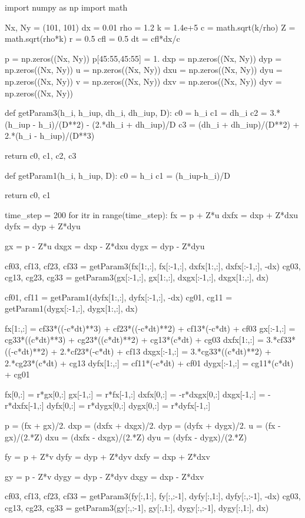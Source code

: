 \documentclass[dvipdfmx, 9pt, a4paper]{jsarticle}
\begin{document}
\begin{python}
import numpy as np
import math

Nx, Ny = (101, 101)
dx = 0.01
rho = 1.2
k = 1.4e+5
c = math.sqrt(k/rho)
Z = math.sqrt(rho*k)
r = 0.5
cfl = 0.5
dt = cfl*dx/c

p = np.zeros((Nx, Ny))
p[45:55,45:55] = 1.
dxp = np.zeros((Nx, Ny))
dyp = np.zeros((Nx, Ny))
u = np.zeros((Nx, Ny))
dxu = np.zeros((Nx, Ny))
dyu = np.zeros((Nx, Ny))
v = np.zeros((Nx, Ny))
dxv = np.zeros((Nx, Ny))
dyv = np.zeros((Nx, Ny))

def getParam3(h_i, h_iup, dh_i, dh_iup, D):
	c0 = h_i
	c1 = dh_i
	c2 = 3.*(h_iup - h_i)/(D**2) - (2.*dh_i + dh_iup)/D
	c3 = (dh_i + dh_iup)/(D**2) + 2.*(h_i - h_iup)/(D**3)

	return c0, c1, c2, c3

def getParam1(h_i, h_iup, D):
	c0 = h_i
	c1 = (h_iup-h_i)/D

	return c0, c1

time_step = 200
for itr in range(time_step):
	fx = p + Z*u
	dxfx = dxp + Z*dxu
	dyfx = dyp + Z*dyu

	gx = p - Z*u
	dxgx = dxp - Z*dxu
	dygx = dyp - Z*dyu

	cf03, cf13, cf23, cf33 = getParam3(fx[1:,:], fx[:-1,:], dxfx[1:,:], dxfx[:-1,:], -dx)
	cg03, cg13, cg23, cg33 = getParam3(gx[:-1,:], gx[1:,:], dxgx[:-1,:], dxgx[1:,:], dx)

	cf01, cf11 = getParam1(dyfx[1:,:], dyfx[:-1,:], -dx)
	cg01, cg11 = getParam1(dygx[:-1,:], dygx[1:,:], dx)

	fx[1:,:] = cf33*((-c*dt)**3) + cf23*((-c*dt)**2) + cf13*(-c*dt) + cf03
	gx[:-1,:] = cg33*((c*dt)**3) + cg23*((c*dt)**2) + cg13*(c*dt) + cg03
	dxfx[1:,:] = 3.*cf33*((-c*dt)**2) + 2.*cf23*(-c*dt) + cf13
	dxgx[:-1,:] = 3.*cg33*((c*dt)**2) + 2.*cg23*(c*dt) + cg13
	dyfx[1:,:] = cf11*(-c*dt) + cf01
	dygx[:-1,:] = cg11*(c*dt) + cg01

	fx[0,:] = r*gx[0,:]
	gx[-1,:] = r*fx[-1,:]
	dxfx[0,:] = -r*dxgx[0,:]
	dxgx[-1,:] = -r*dxfx[-1,:]
	dyfx[0,:] = r*dygx[0,:]
	dygx[0,:] = r*dyfx[-1,:]

	p = (fx + gx)/2.
	dxp = (dxfx + dxgx)/2.
	dyp = (dyfx + dygx)/2.
	u = (fx - gx)/(2.*Z)
	dxu = (dxfx - dxgx)/(2.*Z)
	dyu = (dyfx - dygx)/(2.*Z)

	fy = p + Z*v
	dyfy = dyp + Z*dyv
	dxfy = dxp + Z*dxv

	gy = p - Z*v
	dygy = dyp - Z*dyv
	dxgy = dxp - Z*dxv

	cf03, cf13, cf23, cf33 = getParam3(fy[:,1:], fy[:,:-1], dyfy[:,1:], dyfy[:,:-1], -dx)
	cg03, cg13, cg23, cg33 = getParam3(gy[:,:-1], gy[:,1:], dygy[:,:-1], dygy[:,1:], dx)


\end{python}
\end{document}
